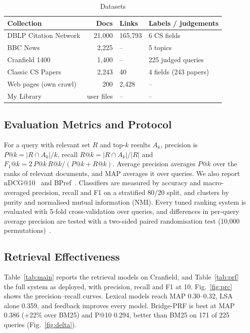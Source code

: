 \documentclass[conference]{IEEEtran}
\begin{document}
\begin{table}[t]
\caption{Datasets}
\label{tab:collections}
\centering\footnotesize
\setlength{\tabcolsep}{3pt}
\begin{tabular}{@{}lrll@{}}
\toprule
Collection & Docs & Links & Labels / judgements \\
\midrule
DBLP Citation Network & 21,000 & 165,793 & 6 CS fields \\
BBC News & 2,225 & -- & 5 topics \\
Cranfield 1400 & 1,400 & -- & 225 judged queries \\
Classic CS Papers & 2,243 & 40 & 4 fields (243 papers) \\
Web pages (own crawl) & 200 & 2,428 & -- \\
My Library & user files & -- & -- \\
\bottomrule
\end{tabular}
\end{table}

\subsection{Evaluation Metrics and Protocol}
For a query with relevant set $R$ and top-$k$ results $A_k$, precision is $P@k=|R\cap A_k|/k$, recall $R@k=|R\cap A_k|/|R|$ and $F_1@k=2\,P@k\,R@k/(P@k+R@k)$. Average precision averages $P@k$ over the ranks of relevant documents, and MAP averages it over queries. We also report nDCG@10~\cite{jarvelin2002} and BPref~\cite{buckley2004}. Classifiers are measured by accuracy and macro-averaged precision, recall and F1 on a stratified 80/20 split, and clusters by purity and normalised mutual information (NMI). Every tuned ranking system is evaluated with 5-fold cross-validation over queries, and differences in per-query average precision are tested with a two-sided paired randomisation test (10,000 permutations)~\cite{smucker2007}.

\subsection{Retrieval Effectiveness}
Table~\ref{tab:main} reports the retrieval models on Cranfield, and Table~\ref{tab:prf} the full system as deployed, with precision, recall and F1 at 10. Fig.~\ref{fig:prc} shows the precision--recall curves. Lexical models reach MAP 0.30--0.32, LSA alone 0.359, and feedback improves every model. Bridge-PRF is best at MAP 0.386 (+22\% over BM25) and P@10 0.294, better than BM25 on 171 of 225 queries (Fig.~\ref{fig:delta}).
\end{document}
